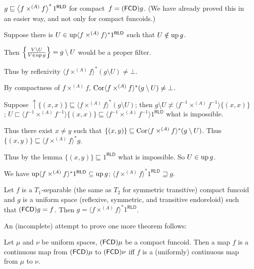 \begin{grayed}
\begin{thm}
$g\sqsubseteq\left\langle f \times^{(A)} f\right\rangle ^{\ast} 1^{\mathsf{RLD}}$
for compact~$f=(\mathsf{FCD}) g$.
(We have already proved this in an easier way, and not only for compact funcoids.)
\end{thm}

Suppose there is $U \in \operatorname{up} \langle f \times^{(A)} f \rangle^{\ast} 1^{\mathsf{RLD}}$
such that $U \notin \operatorname{up} g$.

Then $\left\{ \frac{ V \setminus U }{ V \in \operatorname{up} g }\right\} = g \setminus U$ would be a proper filter.

Thus by reflexivity $\langle f \times^{(A)} f \rangle^{\ast} (g \setminus U) \neq
\bot$.

By compactness of $f \times^{(A)} f$, $\operatorname{Cor} \langle f \times^{(A)} f \rangle^{\ast}
(g \setminus U) \neq \bot$.

Suppose $\uparrow \{ (x , x) \} \sqsubseteq \langle f \times^{(A)} f \rangle^{\ast}
(g \setminus U)$; then $g \setminus U \nasymp \langle f^{- 1} \times^{(A)} f^{- 1}
\rangle \{ (x , x) \}$; $U \sqsubset \langle f^{- 1} \times^{(A)} f^{- 1} \rangle \{
(x , x) \} \sqsubseteq \langle f^{- 1} \times^{(A)} f^{- 1} \rangle 1^{\mathsf{RLD}}$ what is
impossible.

Thus there exist $x \neq y$ such that $\{ (x , y) \} \sqsubseteq \operatorname{Cor}
\langle f \times^{(A)} f \rangle^{\ast} (g \setminus U)$. Thus $\{ (x , y) \}
\sqsubseteq \langle f \times^{(A)} f \rangle^{\ast} g$.

Thus by the lemma $\{ (x , y) \} \sqsubseteq 1^{\mathsf{RLD}}$ what is impossible. So $U
\in \operatorname{up} g$.

We have $\operatorname{up} \langle f \times^{(A)} f \rangle^{\ast} 1^{\mathsf{RLD}} \subseteq
\operatorname{up} g$; $\langle f \times^{(A)} f \rangle^{\ast} 1^{\mathsf{RLD}} \sqsupseteq g$.

\begin{cor}
  Let $f$ is a $T_1$-separable (the same as $T_2$ for symmetric transitive)
  compact funcoid and $g$ is a uniform space (reflexive, symmetric, and
  transitive endoreloid) such that $(\mathsf{FCD}) g = f$. Then $g =
  \langle f \times^{(A)} f \rangle^{\ast} 1^{\mathsf{RLD}}$.
\end{cor}
\end{grayed}


An (incomplete) attempt to prove one more theorem follows:

\begin{thm}
  Let $\mu$ and $\nu$ be uniform spaces, $(\mathsf{FCD})
  \mu$ be a compact funcoid. Then a map $f$ is a continuous map from
  $(\mathsf{FCD}) \mu$ to $(\mathsf{FCD}) \nu$ iff $f$ is
  a (uniformly) continuous map from $\mu$ to $\nu$.
\end{thm}

